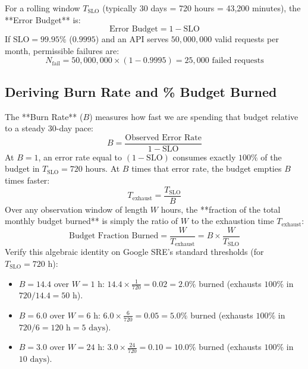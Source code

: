 For a rolling window $T_{\text{SLO}}$ (typically 30 days = 720 hours = 43,200 minutes), the **Error Budget** is:
\begin{equation}
\text{Error Budget} = 1 - \text{SLO}
\end{equation}
If $\text{SLO} = 99.95\%$ ($0.9995$) and an API serves $50,000,000$ valid requests per month, permissible failures are:
\begin{equation}
N_{\text{fail}} = 50,000,000 \times (1 - 0.9995) = 25,000 \text{ failed requests}
\end{equation}

\subsection{Deriving Burn Rate and \% Budget Burned}

The **Burn Rate** ($B$) measures how fast we are spending that budget relative to a steady 30-day pace:
\begin{equation}
B = \frac{\text{Observed Error Rate}}{1 - \text{SLO}}
\end{equation}
At $B = 1$, an error rate equal to $(1 - \text{SLO})$ consumes exactly $100\%$ of the budget in $T_{\text{SLO}} = 720\text{ hours}$. At $B$ times that error rate, the budget empties $B$ times faster:
\begin{equation}
T_{\text{exhaust}} = \frac{T_{\text{SLO}}}{B}
\end{equation}
Over any observation window of length $W$ hours, the **fraction of the total monthly budget burned** is simply the ratio of $W$ to the exhaustion time $T_{\text{exhaust}}$:
\begin{equation}
\text{Budget Fraction Burned} = \frac{W}{T_{\text{exhaust}}} = B \times \frac{W}{T_{\text{SLO}}}
\end{equation}
Verify this algebraic identity on Google SRE's standard thresholds (for $T_{\text{SLO}} = 720\text{ h}$):
\begin{itemize}[leftmargin=18pt]
  \item $B = 14.4$ over $W = 1\text{ h}$: $14.4 \times \frac{1}{720} = 0.02 = \mathbf{2.0\%}$ burned (exhausts $100\%$ in $720/14.4 = 50\text{ h}$).
  \item $B = 6.0$ over $W = 6\text{ h}$: $6.0 \times \frac{6}{720} = 0.05 = \mathbf{5.0\%}$ burned (exhausts $100\%$ in $720/6 = 120\text{ h} = 5\text{ days}$).
  \item $B = 3.0$ over $W = 24\text{ h}$: $3.0 \times \frac{24}{720} = 0.10 = \mathbf{10.0\%}$ burned (exhausts $100\%$ in $10\text{ days}$).
\end{itemize}


